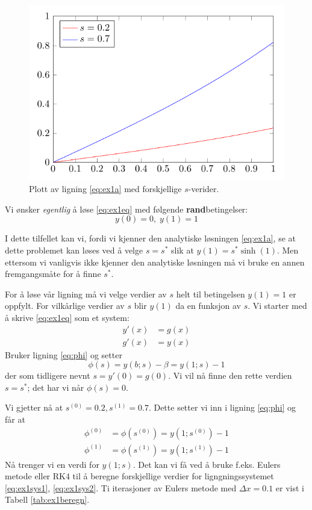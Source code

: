 \begin{figure}[htb]
  \centering
  \includegraphics[]{illustrations/plot_s.pdf}
  \caption{Plott av ligning \eqref{eq:ex1a} med forskjellige $s$-verider.}
  \label{fig:s_verdier}
\end{figure}

\noindent Vi ønsker \emph{egentlig} å løse \eqref{eq:ex1eq} med følgende \textbf{rand}betingelser:
\begin{equation}
  y(0) = 0, \; y(1) = 1 \tag{rb}
\end{equation}

I dette tilfellet kan vi, fordi vi kjenner den analytiske løsningen \eqref{eq:ex1a}, se at dette problemet kan løses ved å velge $s=s^*$ slik at $y(1)=s^* \sinh(1)$. Men ettersom vi vanligvis ikke kjenner den analytiske løsningen må vi bruke en annen fremgangsmåte for å finne $s^*$.

For å løse vår ligning må vi velge verdier av $s$ helt til betingelsen $y(1)=1$ er oppfylt. For vilkårlige verdier av $s$ blir $y(1)$ da en funksjon av $s$. Vi starter med å skrive \eqref{eq:ex1eq} som et system:
\begin{align}
  y'(x) &= g(x) \label{eq:ex1sys1} \\
  g'(x) &= y(x) \label{eq:ex1sys2}
\end{align}
Bruker ligning \eqref{eq:phi} og setter
\begin{equation}
  \phi (s) = y(b;s) - \beta = y(1;s) - 1
\end{equation}
der som tidligere nevnt $s=y'(0)=g(0)$. Vi vil nå finne den rette verdien $s=s^*$; det har vi når $\phi(s)=0$.

Vi gjetter nå at $s^{(0)}=0.2, s^{(1)}=0.7$. Dette setter vi inn i ligning \eqref{eq:phi} og får at
\begin{align}
  \phi^{(0)} &= \phi(s^{(0)}) = y(1;s^{(0)}) - 1 \label{eq:exphi1} \\
  \phi^{(1)} &= \phi(s^{(1)}) = y(1;s^{(1)}) - 1 \label{eq:exphi2}
\end{align}
Nå trenger vi en verdi for $y(1;s)$. Det kan vi få ved å bruke f.eks. Eulers metode eller RK4 til å beregne forskjellige verdier for ligngningssystemet \eqref{eq:ex1sys1}, \eqref{eq:ex1sys2}. Ti iterasjoner av Eulers metode med $\Delta x=0.1$ er vist i Tabell \ref{tab:ex1beregn}.

